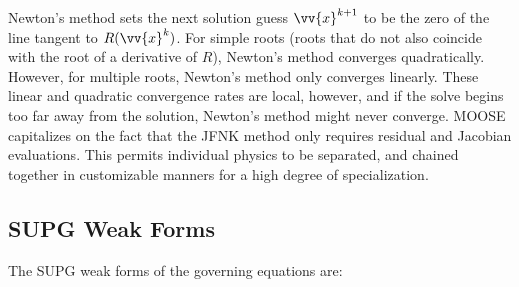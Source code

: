 \documentclass[10pt]{article}
\numberwithin{equation}{section} %
\begin{document}
Newton's method sets the next solution guess \(\vv{x}^{k+1}\) to be the zero of the line tangent to \(R(\vv{x}^k)\). For simple roots (roots that do not also coincide with the root of a derivative of \(R\)), Newton's method converges quadratically. However, for multiple roots, Newton's method only converges linearly. These linear and quadratic convergence rates are local, however, and if the solve begins too far away from the solution, Newton's method might never converge. MOOSE capitalizes on the fact that the JFNK method only requires residual and Jacobian evaluations. This permits individual physics to be separated, and chained together in customizable manners for a high degree of specialization. 

\subsection{SUPG Weak Forms}
\label{sec:SUPG}

The SUPG weak forms of the governing equations are:
\end{document}
